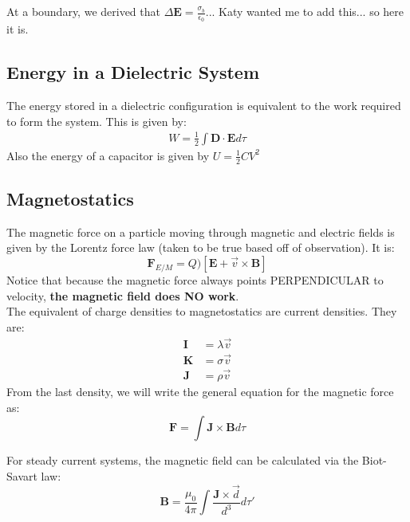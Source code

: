 \documentclass[a4paper, 11pt]{article}
\begin{document}
		\noindent At a boundary, we derived that $\Delta \mathbf{E} = \frac{\sigma_b}{\epsilon_0}$... Katy wanted me to add this... so here it is. \\ 
		
	\subsection*{Energy in a Dielectric System}
		The energy stored in a dielectric configuration is equivalent to the work required to form the system. This is given by: 
			\begin{eqnarray}
				W = \frac{1}{2} \int \mathbf{D} \cdot \mathbf{E} d\tau
			\end{eqnarray}
		Also the energy of a capacitor is given by $U = \frac{1}{2}CV^2$
	\subsection*{Magnetostatics}
		The magnetic force on a particle moving through magnetic and electric fields is given by the Lorentz force law (taken to be true based off of observation). It is: 
			\begin{equation}
				\mathbf{F}_{E/M} = Q)[\mathbf{E} +\vec{v}\times\mathbf{B}]
			\end{equation}
		Notice that because the magnetic force always points PERPENDICULAR to velocity, \textbf{the magnetic field does NO work}.\\ 
		
		\noindent The equivalent of charge densities to magnetostatics are current densities. They are: 
			\begin{align}
				\mathbf{I} &= \lambda \vec{v} \\ 
				\mathbf{K} &= \sigma \vec{v} \\ 
				\mathbf{J} &= \rho \vec{v} 
			\end{align}
		From the last density, we will write the general equation for the magnetic force as: 
			\begin{equation}
				\mathbf{F} = \int \mathbf{J} \times \mathbf{B} d\tau
			\end{equation} 
			
		For steady current systems, the magnetic field can be calculated via the Biot-Savart law: 
			\begin{equation}
				\mathbf{B} = \frac{\mu_0}{4\pi} \int \frac{\mathbf{J}\times \vec{d}}{d^3} d\tau' 
			\end{equation}
			
\end{document}
